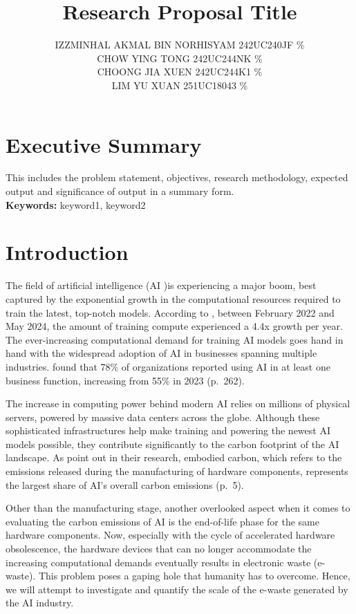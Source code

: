 \documentclass[a4paper, 12pt]{article}
\author{
IZZMINHAL AKMAL BIN NORHISYAM \quad 242UC240JF \quad 25\% \\
CHOW YING TONG \quad 242UC244NK \quad 25\% \\
CHOONG JIA XUEN \quad 242UC244K1 \quad 25\% \\
LIM YU XUAN \quad 251UC18043 \quad 25\% \\
}
\title{ Research Proposal Title  }
\begin{document}
\maketitle

\section*{Executive Summary}
This includes the problem statement, objectives, research methodology, expected output and significance of output in a summary form. 
\hfill
\\
\textbf{Keywords:} keyword1, keyword2 \\

\section{Introduction}
The field of artificial intelligence (AI )is experiencing a major boom, best captured by the exponential growth in the computational resources required to train the latest, top-notch models. According to \citet{Sevilla_Roldan_2024}, between February 2022 and May 2024, the amount of training compute experienced a 4.4x growth per year. The ever-increasing computational demand for training AI models goes hand in hand with the widespread adoption of AI in businesses spanning multiple industries. \citet{Maslej2025} found that 78\% of organizations reported using AI in at least one business function, increasing from 55\% in 2023 (p.~262). 

\par The increase in computing power behind modern AI relies on millions of physical servers, powered by massive data centers across the globe. Although these sophisticated infrastructures help make training and powering the newest AI models possible, they contribute significantly to the carbon footprint of the AI landscape. As \citet{Wu2022} point out in their research, embodied carbon, which refers to the emissions released during the manufacturing of hardware components, represents the largest share of AI’s overall carbon emissions (p.~5). 

\par Other than the manufacturing stage, another overlooked aspect when it comes to evaluating the carbon emissions of AI is the end-of-life phase for the same hardware components. Now, especially with the cycle of accelerated hardware obsolescence, the hardware devices that can no longer accommodate the increasing computational demands eventually results in electronic waste (e-waste). This problem poses a gaping hole that humanity has to overcome. Hence, we will attempt to investigate and quantify the scale of the e-waste generated by the AI industry.
\end{document}
